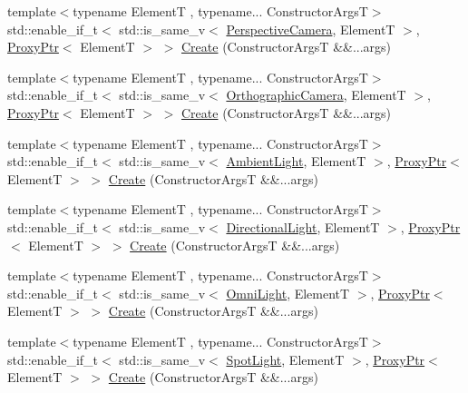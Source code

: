\begin{DoxyCompactItemize}
\item 
{\footnotesize template$<$typename ElementT , typename... Constructor\+ArgsT$>$ }\\std\+::enable\+\_\+if\+\_\+t$<$ std\+::is\+\_\+same\+\_\+v$<$ \hyperlink{classmage_1_1_perspective_camera}{Perspective\+Camera}, ElementT $>$, \hyperlink{classmage_1_1_proxy_ptr}{Proxy\+Ptr}$<$ ElementT $>$ $>$ \hyperlink{classmage_1_1_scene_a6ee9550d99197a28efbaab2c9884be10}{Create} (Constructor\+ArgsT \&\&...args)
\item 
{\footnotesize template$<$typename ElementT , typename... Constructor\+ArgsT$>$ }\\std\+::enable\+\_\+if\+\_\+t$<$ std\+::is\+\_\+same\+\_\+v$<$ \hyperlink{classmage_1_1_orthographic_camera}{Orthographic\+Camera}, ElementT $>$, \hyperlink{classmage_1_1_proxy_ptr}{Proxy\+Ptr}$<$ ElementT $>$ $>$ \hyperlink{classmage_1_1_scene_a18f8c3f1a37c01620cecbb0e6643f2fc}{Create} (Constructor\+ArgsT \&\&...args)
\item 
{\footnotesize template$<$typename ElementT , typename... Constructor\+ArgsT$>$ }\\std\+::enable\+\_\+if\+\_\+t$<$ std\+::is\+\_\+same\+\_\+v$<$ \hyperlink{classmage_1_1_ambient_light}{Ambient\+Light}, ElementT $>$, \hyperlink{classmage_1_1_proxy_ptr}{Proxy\+Ptr}$<$ ElementT $>$ $>$ \hyperlink{classmage_1_1_scene_aaa36f5e8f0aa59adff6ee0f4e534b9ad}{Create} (Constructor\+ArgsT \&\&...args)
\item 
{\footnotesize template$<$typename ElementT , typename... Constructor\+ArgsT$>$ }\\std\+::enable\+\_\+if\+\_\+t$<$ std\+::is\+\_\+same\+\_\+v$<$ \hyperlink{classmage_1_1_directional_light}{Directional\+Light}, ElementT $>$, \hyperlink{classmage_1_1_proxy_ptr}{Proxy\+Ptr}$<$ ElementT $>$ $>$ \hyperlink{classmage_1_1_scene_a510c931b82dc5a5a1367d2b3f34b0bb0}{Create} (Constructor\+ArgsT \&\&...args)
\item 
{\footnotesize template$<$typename ElementT , typename... Constructor\+ArgsT$>$ }\\std\+::enable\+\_\+if\+\_\+t$<$ std\+::is\+\_\+same\+\_\+v$<$ \hyperlink{classmage_1_1_omni_light}{Omni\+Light}, ElementT $>$, \hyperlink{classmage_1_1_proxy_ptr}{Proxy\+Ptr}$<$ ElementT $>$ $>$ \hyperlink{classmage_1_1_scene_a07694db8844dc96c47f838bd48d4f56b}{Create} (Constructor\+ArgsT \&\&...args)
\item 
{\footnotesize template$<$typename ElementT , typename... Constructor\+ArgsT$>$ }\\std\+::enable\+\_\+if\+\_\+t$<$ std\+::is\+\_\+same\+\_\+v$<$ \hyperlink{classmage_1_1_spot_light}{Spot\+Light}, ElementT $>$, \hyperlink{classmage_1_1_proxy_ptr}{Proxy\+Ptr}$<$ ElementT $>$ $>$ \hyperlink{classmage_1_1_scene_a1cd3d70a20c1f46291329d8e853d1552}{Create} (Constructor\+ArgsT \&\&...args)

\end{DoxyCompactItemize}
